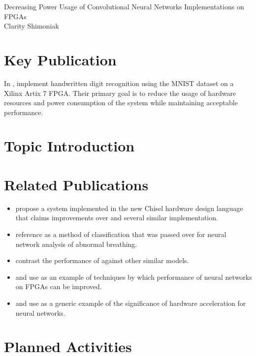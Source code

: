 \documentclass[12pt,letterpaper,english]{article}
\begin{document}
\begin{center}
	{\LARGE%
		Decreasing Power Usage of
		Convolutional Neural Networks Implementations
		on FPGAs
	} \\
	\vspace{6pt}
	Clarity Shimoniak
\end{center}

\section*{Key Publication}

In , \citeauthor{main} implement handwritten digit recognition
using the MNIST dataset on a Xilinx Artix 7 FPGA. Their primary goal is to
reduce the usage of hardware resources and power consumption of the system while
maintaining acceptable performance.


\section*{Topic Introduction}



\section*{Related Publications}

\begin{itemize}
	\item \citeauthor{madineni2023parameterizable} propose a system implemented
	in the new Chisel hardware design language that claims improvements over
	 and several similar implementation.
	\item \citeauthor{baedorf2023reverse} reference  as a method
	of classification that was passed over for neural network analysis of
	abnormal breathing.
	\item \citeauthor{phipps2023pre} contrast the performance of
	 against other similar models.
	\item \citeauthor*{pistellato2023quantization} and \citeauthor*{yan2023end}
	use  as an example of techniques by which performance of
	neural networks on FPGAs can be improved.
	\item \citeauthor*{aydin2023fpga} and \citeauthor*{naufal2023comparative}
	use  as a generic example of the significance of hardware
	acceleration for neural networks.
\end{itemize}


\section*{Planned Activities}



\newpage
\printbibliography
\end{document}
